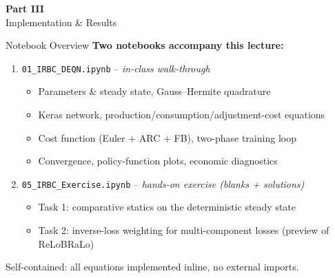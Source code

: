 \documentclass[aspectratio=169,11pt]{beamer}
\begin{document}

\begin{frame}{}
\vfill
\begin{center}
{\Huge \textcolor{uzhblue}{\textbf{Part III}}}\\[12pt]
{\LARGE Implementation \& Results}
\end{center}
\vfill
\end{frame}

\begin{frame}{Notebook Overview}
\textbf{Two notebooks accompany this lecture:}

\vspace{0.5em}
\begin{enumerate}
    \item \texttt{01\_IRBC\_DEQN.ipynb} -- \emph{in-class walk-through}
    \begin{itemize}\itemsep1pt\vspace{2pt}
        \item Parameters \& steady state, Gauss--Hermite quadrature
        \item Keras network, production/consumption/adjustment-cost equations
        \item Cost function (Euler + ARC + FB), two-phase training loop
        \item Convergence, policy-function plots, economic diagnostics
    \end{itemize}

    \vspace{0.3em}
    \item \texttt{05\_IRBC\_Exercise.ipynb} -- \emph{hands-on exercise (blanks + solutions)}
    \begin{itemize}\itemsep1pt\vspace{2pt}
        \item Task 1: comparative statics on the deterministic steady state
        \item Task 2: inverse-loss weighting for multi-component losses (preview of ReLoBRaLo)
    \end{itemize}
\end{enumerate}

\vspace{0.4em}
{\small Self-contained: all equations implemented inline, no external imports.}
\end{frame}
\end{document}
